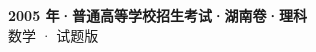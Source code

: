 \documentclass[zihao=-4, a4paper]{ctexart}
\begin{document}
\begin{center}
  {\Large\bfseries 2005 年·普通高等学校招生考试·湖南卷·理科}\\[4pt]
  {\large 数学 · 试题版}
\end{center}
\medskip
{}

\end{document}

